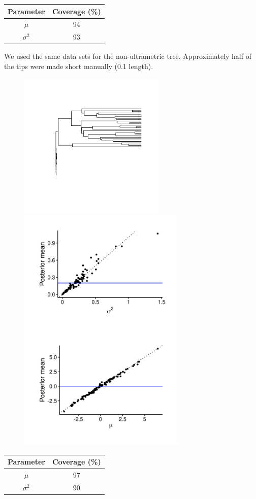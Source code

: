 \documentclass{article}
\begin{document}
\begin{center}
\begin{tabular}{c | c}
    Parameter & Coverage (\%) \\\hline
    $\mu$ & 94\\
    $\sigma^2$ & 93
\end{tabular}
\end{center}

\newpage

\noindent We used the same data sets for the non-ultrametric tree. Approximately half of the tips were made short manually (0.1 length).

\begin{figure}[!ht]
  \begin{minipage}[c]{.4\textwidth}
    \centering
    \includegraphics[width=7cm]{../BMMVN_nonultra_tree.png}
  \end{minipage}
  \hfill
  \begin{minipage}{.5\textwidth}
    \centering
    \includegraphics[width=8cm]{../BMMVN_nonultra_graphs.png}
  \end{minipage}
\end{figure}

\begin{center}
\begin{tabular}{c | c}
    Parameter & Coverage (\%) \\\hline
    $\mu$ & 97\\
    $\sigma^2$ & 90
\end{tabular}
\end{center}
\end{document}
